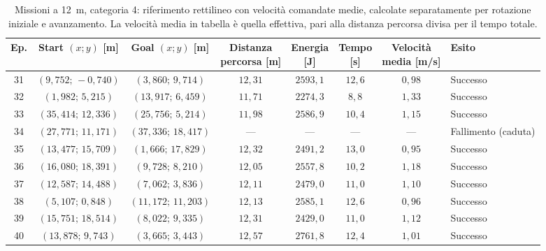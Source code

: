 \begin{table}[H]
\centering
\caption{Missioni a 12~m, categoria 4: riferimento rettilineo con velocità comandate medie, calcolate separatamente per rotazione iniziale e avanzamento. La velocità media in tabella è quella effettiva, pari alla distanza percorsa divisa per il tempo totale.}
\label{tab:straight-line-command-mean-12m-cat4}
\begingroup
\fontsize{9}{11}\selectfont
\setlength{\tabcolsep}{2.5pt}
\renewcommand{\arraystretch}{1.2}
\begin{tabular}{@{}c cc cccc l@{}}
\toprule
Ep. & \shortstack{Start $(x;y)$\\{}[m]} & \shortstack{Goal $(x;y)$\\{}[m]} & \shortstack{Distanza\\percorsa [m]} & \shortstack{Energia\\{}[J]} & \shortstack{Tempo\\{}[s]} & \shortstack{Velocità\\media [m/s]} & Esito \\
\midrule
31 & $(9{,}752;\,-0{,}740)$ & $(3{,}860;\,9{,}714)$ & $12{,}31$ & $2593{,}1$ & $12{,}6$ & $0{,}98$ & Successo \\
32 & $(1{,}982;\,5{,}215)$ & $(13{,}917;\,6{,}459)$ & $11{,}71$ & $2274{,}3$ & $8{,}8$ & $1{,}33$ & Successo \\
33 & $(35{,}414;\,12{,}336)$ & $(25{,}756;\,5{,}214)$ & $11{,}98$ & $2586{,}9$ & $10{,}4$ & $1{,}15$ & Successo \\
34 & $(27{,}771;\,11{,}171)$ & $(37{,}336;\,18{,}417)$ & --- & --- & --- & --- & Fallimento (caduta) \\
35 & $(13{,}477;\,15{,}709)$ & $(1{,}666;\,17{,}829)$ & $12{,}32$ & $2491{,}2$ & $13{,}0$ & $0{,}95$ & Successo \\
36 & $(16{,}080;\,18{,}391)$ & $(9{,}728;\,8{,}210)$ & $12{,}05$ & $2557{,}8$ & $10{,}2$ & $1{,}18$ & Successo \\
37 & $(12{,}587;\,14{,}488)$ & $(7{,}062;\,3{,}836)$ & $12{,}11$ & $2479{,}0$ & $11{,}0$ & $1{,}10$ & Successo \\
38 & $(5{,}107;\,0{,}848)$ & $(11{,}172;\,11{,}203)$ & $12{,}13$ & $2585{,}1$ & $12{,}6$ & $0{,}96$ & Successo \\
39 & $(15{,}751;\,18{,}514)$ & $(8{,}022;\,9{,}335)$ & $12{,}31$ & $2429{,}0$ & $11{,}0$ & $1{,}12$ & Successo \\
40 & $(13{,}878;\,9{,}743)$ & $(3{,}665;\,3{,}443)$ & $12{,}57$ & $2761{,}8$ & $12{,}4$ & $1{,}01$ & Successo \\
\bottomrule
\end{tabular}
\endgroup
\end{table}
